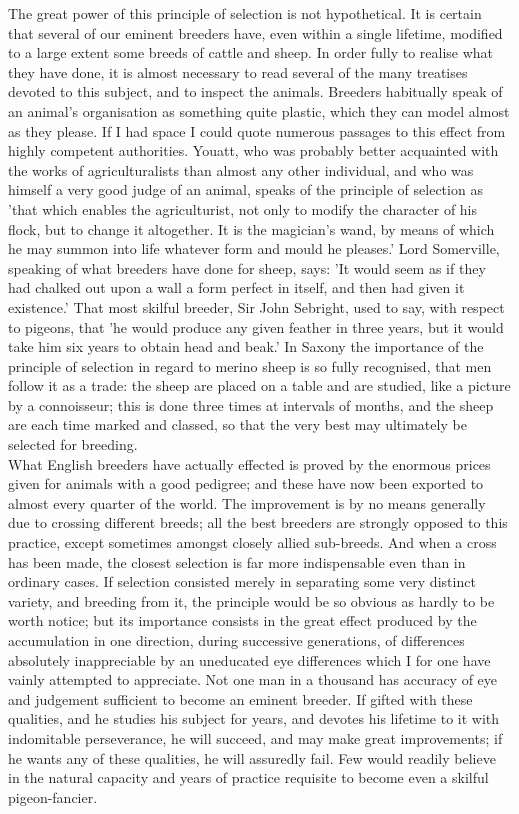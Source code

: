 \indent The great power of this principle of selection is not hypothetical. It is certain that several of our eminent breeders have, even within a single lifetime, modified to a large extent some breeds of cattle and sheep. In order fully to realise what they have done, it is almost necessary to read several of the many treatises devoted to this subject, and to inspect the animals. Breeders habitually speak of an animal's organisation as something quite plastic, which they can model almost as they please. If I had space I could quote numerous passages to this effect from highly competent authorities. Youatt, who was probably better acquainted with the works of agriculturalists than almost any other individual, and who was himself a very good judge of an animal, speaks of the principle of selection as 'that which enables the agriculturist, not only to modify the character of his flock, but to change it altogether. It is the magician's wand, by means of which he may summon into life whatever form and mould he pleases.' Lord Somerville, speaking of what breeders have done for sheep, says:   'It would seem as if they had chalked out upon a wall a form perfect in itself, and then had given it existence.' That most skilful breeder, Sir John Sebright, used to say, with respect to pigeons, that 'he would produce any given feather in three years, but it would take him six years to obtain head and beak.' In Saxony the importance of the principle of selection in regard to merino sheep is so fully recognised, that men follow it as a trade: the sheep are placed on a table and are studied, like a picture by a connoisseur; this is done three times at intervals of months, and the sheep are each time marked and classed, so that the very best may ultimately be selected for breeding.  \\
\indent What English breeders have actually effected is proved by the enormous prices given for animals with a good pedigree; and these have now been exported to almost every quarter of the world. The improvement is by no means generally due to crossing different breeds; all the best breeders are strongly opposed to this practice, except sometimes amongst closely allied sub-breeds.  And when a cross has been made, the closest selection is far more indispensable even than in ordinary cases. If selection consisted merely in separating some very distinct variety, and breeding from it, the principle would be so obvious as hardly to be worth notice; but its importance consists in the great effect produced by the accumulation in one direction, during successive generations, of differences absolutely inappreciable by an uneducated eye differences which I for one have vainly attempted to appreciate. Not one man in a thousand has accuracy of eye and judgement sufficient to become an eminent breeder. If gifted with these qualities, and he studies his subject for years, and devotes his lifetime to it with indomitable perseverance, he will succeed, and may make great improvements; if he wants any of these qualities, he will assuredly fail. Few would readily believe in the natural capacity and years of practice requisite to become even a skilful pigeon-fancier.  \\
